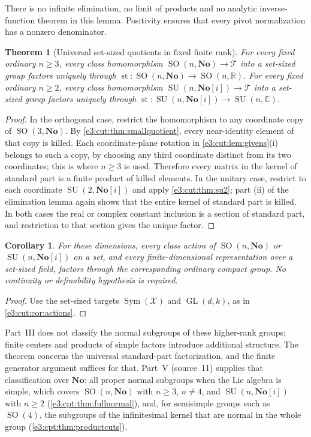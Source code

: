 \documentclass[11pt,letterpaper]{article}
\numberwithin{equation}{section}
\newtheorem{theorem}{Theorem}[section]
\newtheorem{corollary}[corollary]{Corollary}
\theoremstyle{definition}
\theoremstyle{remark}
\newcommand{\No}{\mathbf{No}}
\newcommand{\R}{\mathbb R}
\newcommand{\C}{\mathbb C}
\newcommand{\st}{\operatorname{st}}
\newcommand{\SO}{\operatorname{SO}}
\newcommand{\SU}{\operatorname{SU}}
\newcommand{\GL}{\operatorname{GL}}
\newcommand{\Sym}{\operatorname{Sym}}
\begin{document}
There is no infinite elimination, no limit of products and no analytic
inverse-function theorem in this lemma. Positivity ensures that every pivot
normalization has a nonzero denominator.

\begin{theorem}[Universal set-sized quotients in fixed finite rank]\label{e3:cut:thm:allranks}
For every fixed ordinary $n\ge3$, every class homomorphism
$\SO(n,\No)\to\mathcal T$ into a set-sized group factors uniquely through
$\st:\SO(n,\No)\to\SO(n,\R)$. For every fixed ordinary $n\ge2$, every class
homomorphism $\SU(n,\No[i])\to\mathcal T$ into a set-sized group factors
uniquely through $\st:\SU(n,\No[i])\to\SU(n,\C)$.
\end{theorem}
\begin{proof}
In the orthogonal case, restrict the homomorphism to any coordinate copy of
$\SO(3,\No)$. By \cref{e3:cut:thm:smallquotient}, every near-identity element of
that copy is killed. Each coordinate-plane rotation in
\cref{e3:cut:lem:givens}(i) belongs to such a copy, by choosing any third
coordinate distinct from its two coordinates; this is where $n\ge3$ is used.
Therefore every matrix in the kernel of standard part is a finite product of
killed elements. In the unitary case, restrict to each coordinate
$\SU(2,\No[i])$ and apply \cref{e3:cut:thm:su2}; part (ii) of the elimination
lemma again shows that the entire kernel of standard part is killed. In both
cases the real or complex constant inclusion is a section of standard part, and
restriction to that section gives the unique factor.
\end{proof}

\begin{corollary}\label{e3:cut:cor:allranksactions}
For these dimensions, every class action of $\SO(n,\No)$ or $\SU(n,\No[i])$ on
a set, and every finite-dimensional representation over a set-sized field,
factors through the corresponding ordinary compact group. No continuity or
definability hypothesis is required.
\end{corollary}
\begin{proof}
Use the set-sized targets $\Sym(\mathcal X)$ and $\GL(d,k)$, as in
\cref{e3:cut:cor:actions}.
\end{proof}

Part~III does not classify the normal subgroups of these higher-rank groups;
finite centers and products of simple factors introduce additional structure.
The theorem concerns the universal standard-part factorization, and the finite
generator argument suffices for that. Part~V (source~11) supplies that
classification over $\No$: all proper normal subgroups when the Lie algebra is
simple, which covers $\SO(n,\No)$ with $n\ge3$, $n\ne4$, and $\SU(n,\No[i])$
with $n\ge2$ (\cref{e3:cpt:thm:fullnormal}), and, for semisimple groups such as
$\SO(4)$, the subgroups of the infinitesimal kernel that are normal in the whole
group (\cref{e3:cpt:thm:productcuts}).
\end{document}
